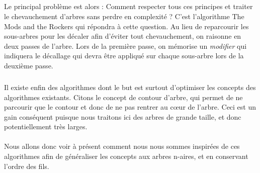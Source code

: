 \subparagraph{}Le principal problème est alors : Comment respecter tous ces principes et traiter le chevauchement d'arbres sans perdre en complexité ? C'est l'algorithme The Mods and the Rockers qui répondra à cette question. Au lieu de reparcourir les sous-arbres pour les décaler afin d'éviter tout chevauchement, on raisonne en deux passes de l'arbre. Lors de la première passe, on mémorise un \emph{modifier} qui indiquera le décallage qui devra être appliqué sur chaque sous-arbre lors de la deuxième passe.

\subparagraph{}Il existe enfin des algorithmes dont le but est surtout d'optimiser les concepts des algorithmes existants. Citons le concept de contour d'arbre, qui permet de ne parcourir que le contour et donc de ne pas rentrer au c\oe{}ur de l'arbre. Ceci est un gain conséquent puisque nous traitons ici des arbres de grande taille, et donc potentiellement très larges.

\paragraph{}Nous allons donc voir à présent comment nous nous sommes inspirées de ces algorithmes afin de généraliser les concepts aux arbres n-aires, et en conservant l'ordre des fils.